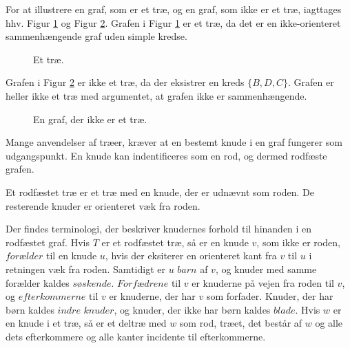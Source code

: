 \begin{exmp}
For at illustrere en graf, som er et træ, og en graf, som ikke er et træ, iagttages hhv. Figur \ref{eksempel_tree} og Figur \ref{eksempel_notree}. Grafen i Figur \ref{eksempel_tree} er et træ, da det er en ikke-orienteret sammenhængende graf uden simple kredse.
\end{exmp}

\begin{figure}[h]
\centering
{}
\caption{Et træ.} 
\label{eksempel_tree}
\end{figure}

\noindent Grafen i Figur \ref{eksempel_notree} er ikke et træ, da der eksistrer en kreds $\lbrace B, D, C \rbrace$. Grafen er heller ikke et træ med argumentet, at grafen ikke er sammenhængende.\\

\begin{figure}[h]
\centering
{}
\caption{En graf, der ikke er et træ.} 
\label{eksempel_notree}
\end{figure}

\noindent Mange anvendelser af træer, kræver at en bestemt knude i en graf fungerer som udgangspunkt. En knude kan indentificeres som en rod, og dermed rodfæste grafen.

\begin{defn}
Et rodfæstet træ er et træ med en knude, der er udnævnt som roden. De resterende knuder er orienteret væk fra roden.
\end{defn}

\noindent Der findes terminologi, der beskriver knudernes forhold til hinanden i en rodfæstet graf. 
Hvis $T$ er et rodfæstet træ, så er en knude $v$, som ikke er roden, $\textit{forælder}$ til en knude $u$, hvis der eksiterer en orienteret kant fra $v$ til $u$ i retningen væk fra roden.
Samtidigt er $u$ $\textit{barn}$ af $v$, og knuder med samme forælder kaldes $\textit{søskende}$. 
$\textit{Forfædrene}$ til $v$ er knuderne på vejen fra roden til $v$, og $\textit{efterkommerne}$ til $v$ er knuderne, der har $v$ som forfader. 
Knuder, der har børn kaldes $\textit{indre knuder}$, og knuder, der ikke har børn kaldes $\textit{blade}$.
Hvis $w$ er en knude i et træ, så er et deltræ med $w$ som rod, træet, det består af $w$ og alle dets efterkommere og alle kanter incidente til efterkommerne.

